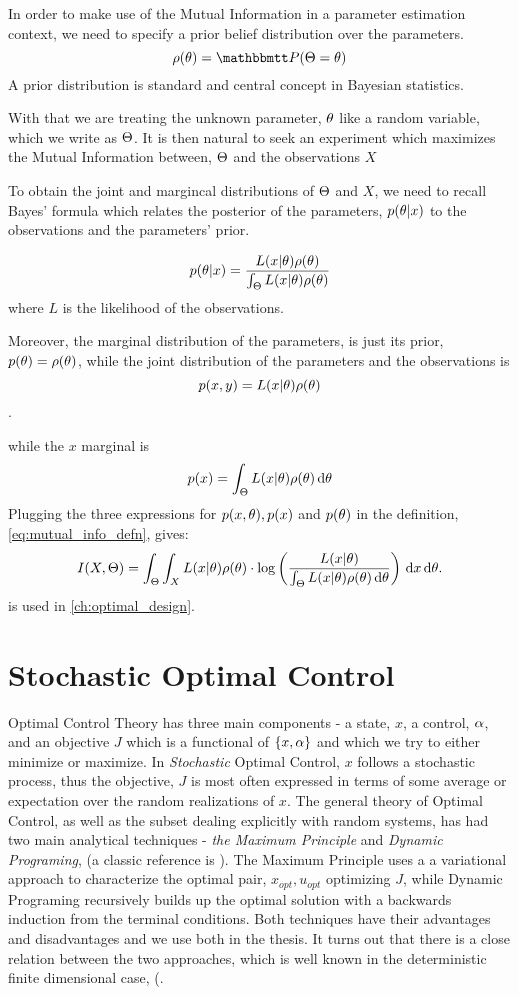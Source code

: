 In order to make use of the Mutual Information in a parameter estimation
context, we need to specify a prior belief distribution over the  parameters.  
$$
\rho(\th) = \Prob(\Theta = \th)
$$
A prior distribution is standard and central concept in Bayesian statistics.
 
With that we are treating the unknown parameter, ${ \theta}$ like a random variable,
which we write as ${\Theta}$. It is then natural to seek an experiment which
maximizes the Mutual Information between, ${\Theta}$ and the observations $X$

To obtain the joint and margincal distributions of ${\Theta}$ and $X$, we
need to recall Bayes' formula which relates the posterior of the parameters,
$p({ \theta}|x)$ to the observations and the parameters' prior. 

\begin{equation}
p({ \theta}|x) = \frac{L(x|{ \theta})\rho({ \theta})}{\int_{\Theta} L(x|{ \theta})\rho({ \theta})}
\label{eq:bayes_formula}
\end{equation}
where $L$ is the likelihood of the observations.

Moreover, the marginal distribution of the parameters, is just its prior,
$p({ \theta}) = \rho({ \theta})$, while the joint distribution of the parameters and the
observations is $$p(x,y) = L(x|{ \theta})\rho({ \theta})$$.

while the $x$ marginal is $$p(x) = \int_\Theta L(x|{ \theta})\rho({ \theta}) \, \mathrm{d} { \theta}$$
Plugging the three expressions for $p(x,{ \theta}), p(x)$ and $p({ \theta})$ in the
definition, \cref{eq:mutual_info_defn}, gives:
\begin{equation}
I(X,{\Theta}) = \int_\Theta \int_X L(x|{ \theta})\rho({ \theta}) \cdot 
\log \left( \frac{L(x|{ \theta}) }
				{\int_\Theta L(x|{ \theta})\rho({ \theta}) \, \mathrm{d} { \theta}  } \right)
\, \mathrm{d} x\, \mathrm{d} { \theta}.
\label{eq:mutual_info_posterior_vs_observations} 
\end{equation} 
  is used in
\cref{ch:optimal_design}.


\section{Stochastic Optimal Control}
Optimal Control Theory has three main components - a state, $x$, a control,
$\alpha$, and an objective $J$ which is a functional of $\{x,\alpha\}$ and which we try
to either minimize or maximize. In {\sl Stochastic} Optimal Control, $x$ follows a
stochastic process, thus the objective, $J$ is most often expressed in terms of
some average or expectation over the random realizations of $x$. The general
theory of Optimal Control, as well as the subset dealing explicitly with random
systems, has had two main analytical techniques - {\sl the Maximum Principle}
and {\sl Dynamic Programing}, (a classic reference is \cite{Fleming1975}). The
Maximum Principle uses a a variational approach to characterize the optimal pair, $x_{opt}, u_{opt}$
optimizing $J$, while Dynamic Programing recursively builds up the optimal
solution with a backwards induction from the terminal conditions. Both
techniques have their advantages and disadvantages and we use both in the thesis. It turns out
that there is a close relation between the two approaches, which is well known
in the deterministic finite dimensional case, (\cite{Fleming1975,Evansb}. 

